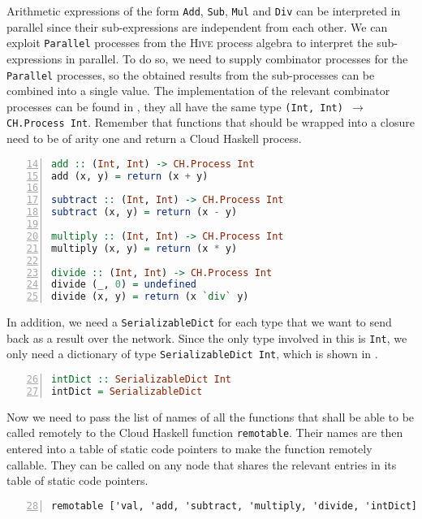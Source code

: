Arithmetic expressions of the form \texttt{Add}, \texttt{Sub}, \texttt{Mul} and \texttt{Div} can be interpreted in parallel since their sub-expressions are independent from each other. We can exploit \texttt{Parallel} processes from the \textsc{Hive} process algebra to interpret the sub-expressions in parallel. To do so, we need to supply combinator processes for the \texttt{Parallel} processes, so the obtained results from the sub-processes can be combined into a single value. The implementation of the relevant combinator processes can be found in , they all have the same type \texttt{(Int, Int) $\to$ CH.Process Int}. Remember that functions that should be wrapped into a closure need to be of arity one and return a \textsf{Cloud Haskell} process.
\begin{lstlisting}[language=Haskell, caption=\textsf{Cloud Haskell} processes for the combination of results from processes that have been executed in parallel., label=lst:arith_combinators,numbers=left, frame=bt, firstnumber=14]
add :: (Int, Int) -> CH.Process Int
add (x, y) = return (x + y)

subtract :: (Int, Int) -> CH.Process Int
subtract (x, y) = return (x - y)

multiply :: (Int, Int) -> CH.Process Int
multiply (x, y) = return (x * y)

divide :: (Int, Int) -> CH.Process Int
divide (_, 0) = undefined
divide (x, y) = return (x `div` y)
\end{lstlisting}

In addition, we need a \texttt{SerializableDict} for each type that we want to send back as a result over the network. Since the only type involved in this is \texttt{Int}, we only need a dictionary of type \texttt{SerializableDict Int}, which is shown in .
\begin{lstlisting}[language=Haskell, caption=\texttt{SerializableDict} for values of type \texttt{Int}., label=lst:arith_dict, numbers=left, frame=bt, firstnumber=26]
intDict :: SerializableDict Int
intDict = SerializableDict
\end{lstlisting}

Now we need to pass the list of names of all the functions that shall be able to be called remotely to the \textsf{Cloud Haskell} function \texttt{remotable}. Their names are then entered into a table of static code pointers to make the function remotely callable. They can be called on any node that shares the relevant entries in its table of static code pointers.
\begin{lstlisting}[language=Haskell, caption=Making functions remotely callable., label=lst:arith_remotable, numbers=left, frame=bt, firstnumber=28]
remotable ['val, 'add, 'subtract, 'multiply, 'divide, 'intDict]
\end{lstlisting}

